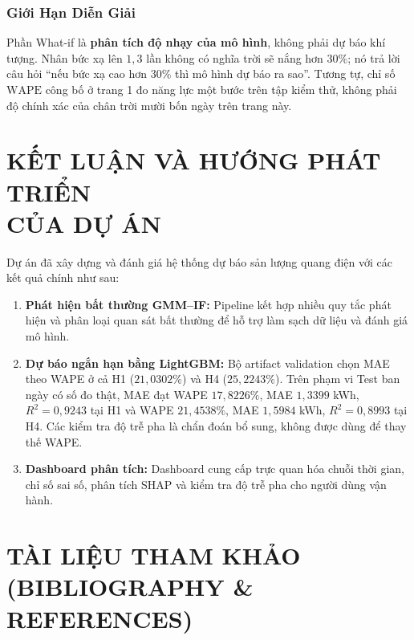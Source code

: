 \documentclass[12pt,a4paper]{article}
\begin{document}
\subsubsection{Giới Hạn Diễn Giải}
Phần What-if là \textbf{phân tích độ nhạy của mô hình}, không phải dự báo khí tượng. Nhân bức xạ lên $1{,}3$ lần không có nghĩa trời sẽ nắng hơn $30\%$; nó trả lời câu hỏi ``nếu bức xạ cao hơn $30\%$ thì mô hình dự báo ra sao''. Tương tự, chỉ số $\text{WAPE}$ công bố ở trang 1 đo năng lực một bước trên tập kiểm thử, không phải độ chính xác của chân trời mười bốn ngày trên trang này.

\section[KẾT LUẬN VÀ HƯỚNG PHÁT TRIỂN]{KẾT LUẬN VÀ HƯỚNG PHÁT TRIỂN\\CỦA DỰ ÁN}
Dự án đã xây dựng và đánh giá hệ thống dự báo sản lượng quang điện với các kết quả chính như sau:
\begin{enumerate}
    \item \textbf{Phát hiện bất thường GMM--IF:} Pipeline kết hợp nhiều quy tắc phát hiện và phân loại quan sát bất thường để hỗ trợ làm sạch dữ liệu và đánh giá mô hình.
    \item \textbf{Dự báo ngắn hạn bằng LightGBM:} Bộ artifact validation chọn MAE theo WAPE ở cả H1 ($21{,}0302\%$) và H4 ($25{,}2243\%$). Trên phạm vi Test ban ngày có số đo thật, MAE đạt WAPE $17{,}8226\%$, MAE $1{,}3399$ kWh, $R^2=0{,}9243$ tại H1 và WAPE $21{,}4538\%$, MAE $1{,}5984$ kWh, $R^2=0{,}8993$ tại H4. Các kiểm tra độ trễ pha là chẩn đoán bổ sung, không được dùng để thay thế WAPE.
    \item \textbf{Dashboard phân tích:} Dashboard cung cấp trực quan hóa chuỗi thời gian, chỉ số sai số, phân tích SHAP và kiểm tra độ trễ pha cho người dùng vận hành.
\end{enumerate}


\section[TÀI LIỆU THAM KHẢO]{TÀI LIỆU THAM KHẢO\\(BIBLIOGRAPHY \& REFERENCES)}
\end{document}
